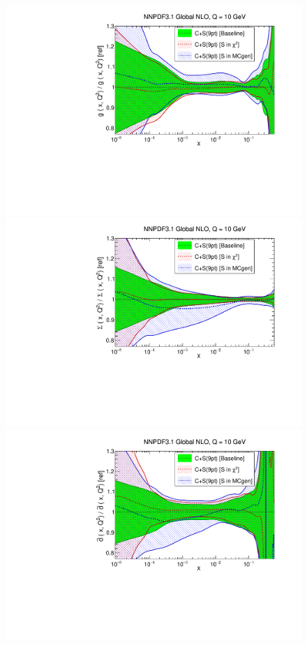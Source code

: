 \begin{figure}[h]
  \begin{center}
    \includegraphics[scale=0.35]{mhous/plots/xg-Global-NLO-CovMatTH-tests.pdf}
    \includegraphics[scale=0.35]{mhous/plots/xsinglet-Global-NLO-CovMatTH-tests.pdf}
    \includegraphics[scale=0.35]{mhous/plots/xdbar-Global-NLO-CovMatTH-tests.pdf}

\end{center}
\end{figure}
